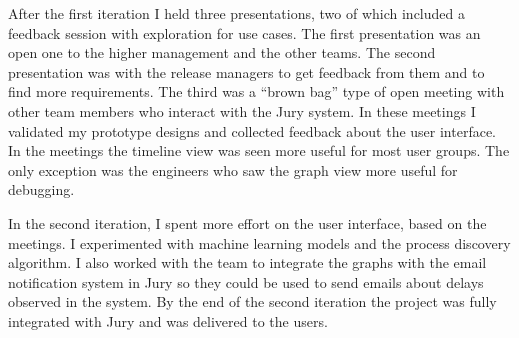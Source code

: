 After the first iteration I held three presentations, two of which included a feedback session with exploration for use cases. The first presentation was an open one to the higher management and the other teams. The second presentation was with the release managers to get feedback from them and to find more requirements. The third was a ``brown bag'' type of open meeting with other team members who interact with the Jury system.
In these meetings I validated my prototype designs and collected feedback about the user interface.
In the meetings the timeline view was seen more useful for most user groups.
The only exception was the engineers who saw the graph view more useful for debugging.

In the second iteration, I spent more effort on the user interface, based on the meetings.
I experimented with machine learning models and the process discovery algorithm.
I also worked with the team to integrate the graphs with the email notification system in Jury so they could be used to send emails about delays observed in the system. 
By the end of the second iteration the project was fully integrated with Jury and was delivered to the users.